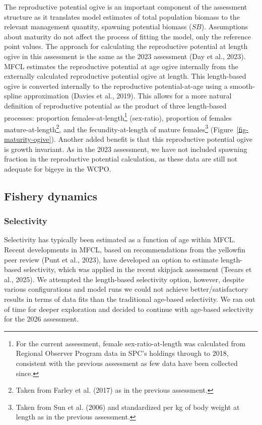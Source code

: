 \documentclass[
  english,
  a4paper,
  a4paper,
  11pt]{SCreport}
\begin{document}
The reproductive potential ogive is an important component of the
assessment structure as it translates model estimates of total
population biomass to the relevant management quantity, spawning
potential biomass (\(SB\)). Assumptions about maturity do not affect the
process of fitting the model, only the reference point values. The
approach for calculating the reproductive potential at length ogive in
this assessment is the same as the 2023 assessment (Day et al., 2023).
MFCL estimates the reproductive potential at age ogive internally from
the externally calculated reproductive potential ogive at length. This
length-based ogive is converted internally to the reproductive
potential-at-age using a smooth-spline approximation (Davies et al.,
2019). This allows for a more natural definition of reproductive
potential as the product of three length-based processes: proportion
females-at-length\footnote{For the current assessment, female
  sex-ratio-at-length was calculated from Regional Observer Program data
  in SPC's holdings through to 2018, consistent with the previous
  assessment as few data have been collected since.} (sex-ratio),
proportion of females mature-at-length\footnote{Taken from Farley et al.
  (2017) as in the previous assessment.}, and the fecundity-at-length of
mature females\footnote{Taken from Sun et al. (2006) and standardized
  per kg of body weight at length as in the previous assessment.}
(Figure~\ref{fig-maturity-ogive}). Another added benefit is that this
reproductive potential ogive is growth invariant. As in the 2023
assessment, we have not included spawning fraction in the reproductive
potential calculation, as these data are still not adequate for bigeye
in the WCPO.

\subsection{Fishery dynamics}\label{sec-model-fihsery-dynamics}

\subsubsection{Selectivity}\label{sec-model-selectivity}

Selectivity has typically been estimated as a function of age within
MFCL. Recent developments in MFCL, based on recommendations from the
yellowfin peer review (Punt et al., 2023), have developed an option to
estimate length-based selectivity, which was applied in the recent
skipjack assessment (Teears et al., 2025). We attempted the length-based
selectivity option, however, despite various configurations and model
runs we could not achieve better/satisfactory results in terms of data
fits than the traditional age-based selectivity. We ran out of time for
deeper exploration and decided to continue with age-based selectivity
for the 2026 assessment.
\end{document}
